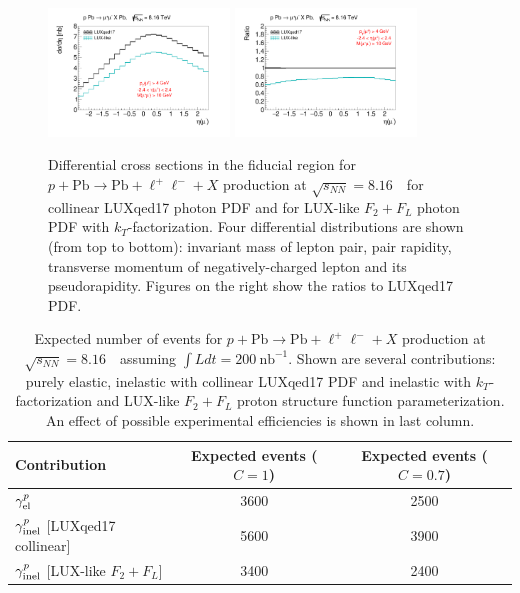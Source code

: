 \begin{figure}[]
\includegraphics[width=0.43\textwidth]{figures/etal_inc_cut_kt.pdf}
\includegraphics[width=0.43\textwidth]{figures/Ratioetal_inc_cut_kt.pdf}
\caption{Differential cross sections in the fiducial region for $p+\textrm{Pb}\rightarrow \textrm{Pb} + \ell^+\ell^- + X$ production at $\sqrt{s_{N N}} = 8.16$~\TeV\ for collinear LUXqed17 photon PDF and
for LUX-like $F_2+F_L$ photon PDF with $k_T$-factorization.
Four differential distributions are shown (from top to bottom): invariant mass of lepton pair, pair rapidity, transverse momentum of negatively-charged lepton and its pseudorapidity. Figures on the right show the ratios to LUXqed17 PDF.}
\label{fig:inc_cut_kt}
\end{figure}


\begin{table}[t]
\begin{center}
\begin{tabular}{|l|c|c|}
\hline
Contribution & Expected events ($C=1$) & Expected events ($C=0.7$) \\
\hline
$\gamma^{p}_{\rm{el}}$  & 3600 & 2500\\ %
\hline
$\gamma^{p}_{\rm{inel}}$ [LUXqed17 collinear] & 5600 & 3900 \\
\hline
$\gamma^{p}_{\rm{inel}}$ [LUX-like $F_2+F_L$] & 3400 & 2400 \\
\hline
\end{tabular}
\end{center}
\caption{Expected number of events for $p+\textrm{Pb}\rightarrow \textrm{Pb} + \ell^+\ell^- + X$ production at $\sqrt{s_{N N}} = 8.16$~\TeV\ assuming $\int Ldt= 200~\textrm{nb}^{-1}$. 
Shown are several contributions: purely elastic, inelastic with collinear LUXqed17 PDF and inelastic with $k_T$-factorization and LUX-like $F_2+F_L$ proton structure function parameterization.
An effect of possible experimental efficiencies is shown in last column.}
\label{fig:numbers}
\end{table}

